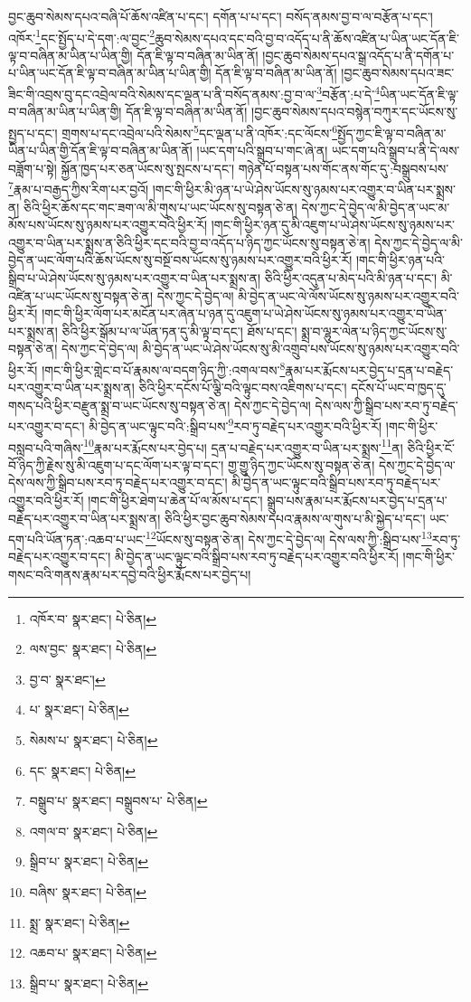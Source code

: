 བྱང་ཆུབ་སེམས་དཔའ་བཞི་པོ་ཆོས་འཛིན་པ་དང་། དགོན་པ་པ་དང་། བསོད་ནམས་བྱ་བ་ལ་བརྩོན་པ་དང་། འཁོར་\footnote{འཁོར་བ་  སྣར་ཐང་།  པེ་ཅིན། }དང་སྤྱོད་པ་དེ་དག་:ལ་བྱང་\footnote{ལས་བྱང་  སྣར་ཐང་།  པེ་ཅིན། }ཆུབ་སེམས་དཔའ་དང་བའི་བྱ་བ་འདོད་པ་ནི་ཆོས་འཛིན་པ་ཡིན་ཡང་དོན་ཇི་ལྟ་བ་བཞིན་མ་ཡིན་པ་ཡིན་གྱི། དོན་ཇི་ལྟ་བ་བཞིན་མ་ཡིན་ནོ། །བྱང་ཆུབ་སེམས་དཔའ་སྒྲ་འདོད་པ་ནི་དགོན་པ་པ་ཡིན་ཡང་དོན་ཇི་ལྟ་བ་བཞིན་མ་ཡིན་པ་ཡིན་གྱི། དོན་ཇི་ལྟ་བ་བཞིན་མ་ཡིན་ནོ། །བྱང་ཆུབ་སེམས་དཔའ་ཟང་ཟིང་གི་འབྲས་བུ་དང་འབྲེལ་བའི་སེམས་དང་ལྡན་པ་ནི་བསོད་ནམས་:བྱ་བ་ལ་\footnote{བྱ་བ་  སྣར་ཐང་། }བརྩོན་:པ་དེ་\footnote{པ་  སྣར་ཐང་།  པེ་ཅིན། }ཡིན་ཡང་དོན་ཇི་ལྟ་བ་བཞིན་མ་ཡིན་པ་ཡིན་གྱི། དོན་ཇི་ལྟ་བ་བཞིན་མ་ཡིན་ནོ། །བྱང་ཆུབ་སེམས་དཔའ་བསྙེན་བཀུར་དང་ཡོངས་སུ་སྤྱད་པ་དང་། གྲགས་པ་དང་འབྲེལ་པའི་སེམས་\footnote{སེམས་པ་  སྣར་ཐང་།  པེ་ཅིན། }དང་ལྡན་པ་ནི་འཁོར་:དང་ལོངས་\footnote{དང་  སྣར་ཐང་།  པེ་ཅིན། }སྤྱོད་ཀྱང་ཇི་ལྟ་བ་བཞིན་མ་ཡིན་པ་ཡིན་གྱི་དོན་ཇི་ལྟ་བ་བཞིན་མ་ཡིན་ནོ། །ཡང་དག་པའི་སྒྲུབ་པ་གང་ཞེ་ན། ཡང་དག་པའི་སྒྲུབ་པ་ནི་དེ་ལས་བཟློག་པ་སྟེ། སྐྱོན་ཁྱད་པར་ཅན་ཡོངས་སུ་སྤངས་པ་དང་། གཉེན་པོ་བསྟན་པས་གོང་ནས་གོང་དུ་:བསྒྲུབས་པས་\footnote{བསྒྲུབ་པ་  སྣར་ཐང་། བསྒྲུབས་པ་  པེ་ཅིན། }རྣམ་པ་བརྒྱད་ཀྱིས་རིག་པར་བྱའོ། །གང་གི་ཕྱིར་མི་ཉན་པ་ཡེ་ཤེས་ཡོངས་སུ་ཉམས་པར་འགྱུར་བ་ཡིན་པར་སྨྲས་ན། ཅིའི་ཕྱིར་ཆོས་དང་གང་ཟག་ལ་མི་གུས་པ་ཡང་ཡོངས་སུ་བསྟན་ཅེ་ན། དེས་ཀྱང་དེ་བྱེད་ལ་མི་བྱེད་ན་ཡང་མ་མོས་པས་ཡོངས་སུ་ཉམས་པར་འགྱུར་བའི་ཕྱིར་རོ། །གང་གི་ཕྱིར་ཉན་དུ་མི་འཇུག་པ་ཡེ་ཤེས་ཡོངས་སུ་ཉམས་པར་འགྱུར་བ་ཡིན་པར་སྨྲས་ན་ཅིའི་ཕྱིར་དང་བའི་བྱ་བ་འདོད་པ་ཉིད་ཀྱང་ཡོངས་སུ་བསྟན་ཅེ་ན། དེས་ཀྱང་དེ་བྱེད་ལ་མི་བྱེད་ན་ཡང་ལོག་པའི་ཆོས་ཡོངས་སུ་བསྔོ་བས་ཡོངས་སུ་ཉམས་པར་འགྱུར་བའི་ཕྱིར་རོ། །གང་གི་ཕྱིར་ཉན་པའི་སྒྲིབ་པ་ཡེ་ཤེས་ཡོངས་སུ་ཉམས་པར་འགྱུར་བ་ཡིན་པར་སྨྲས་ན། ཅིའི་ཕྱིར་འདུན་པ་མེད་པའི་མི་ཉན་པ་དང་། མི་འཛིན་པ་ཡང་ཡོངས་སུ་བསྟན་ཅེ་ན། དེས་ཀྱང་དེ་བྱེད་ལ། མི་བྱེད་ན་ཡང་ལེ་ལོས་ཡོངས་སུ་ཉམས་པར་འགྱུར་བའི་ཕྱིར་རོ། །གང་གི་ཕྱིར་ལོག་པར་མངོན་པར་ཞེན་པ་ཉན་དུ་འཇུག་པ་ཡེ་ཤེས་ཡོངས་སུ་ཉམས་པར་འགྱུར་བ་ཡིན་པར་སྨྲས་ན། ཅིའི་ཕྱིར་སྒོམ་པ་ལ་ཡོན་ཏན་དུ་མི་ལྟ་བ་དང་། ཐོས་པ་དང་། སྨྲ་བ་ལྷུར་ལེན་པ་ཉིད་ཀྱང་ཡོངས་སུ་བསྟན་ཅེ་ན། དེས་ཀྱང་དེ་བྱེད་ལ། མི་བྱེད་ན་ཡང་ཡེ་ཤེས་ཡོངས་སུ་མི་འགྲུབ་པས་ཡོངས་སུ་ཉམས་པར་འགྱུར་བའི་ཕྱིར་རོ། །གང་གི་ཕྱིར་གླེང་བ་པོ་རྣམས་ལ་བདག་ཉིད་ཀྱི་:འགལ་བས་\footnote{འགལ་བ་  སྣར་ཐང་།  པེ་ཅིན། }རྣམ་པར་རྨོངས་པར་བྱེད་པ་དྲན་པ་བརྗེད་པར་འགྱུར་བ་ཡིན་པར་སྨྲས་ན། ཅིའི་ཕྱིར་དངོས་པོ་ལྕི་བའི་ལྟུང་བས་འཇིགས་པ་དང་། དངོས་པོ་ཡང་བ་ཁྱད་དུ་གསད་པའི་ཕྱིར་བརྫུན་སྨྲ་བ་ཡང་ཡོངས་སུ་བསྟན་ཅེ་ན། དེས་ཀྱང་དེ་བྱེད་ལ། དེས་ལས་ཀྱི་སྒྲིབ་པས་རབ་ཏུ་བརྗེད་པར་འགྱུར་བ་དང་། མི་བྱེད་ན་ཡང་ལྟུང་བའི་:སྒྲིབ་པས་\footnote{སྒྲིབ་པ་  སྣར་ཐང་།  པེ་ཅིན། }རབ་ཏུ་བརྗེད་པར་འགྱུར་བའི་ཕྱིར་རོ། །གང་གི་ཕྱིར་བསླབ་པའི་གཞིས་\footnote{བཞིས་  སྣར་ཐང་།  པེ་ཅིན། }རྣམ་པར་རྨོངས་པར་བྱེད་པ། དྲན་པ་བརྗེད་པར་འགྱུར་བ་ཡིན་པར་སྨྲས་\footnote{སྨྲ་  སྣར་ཐང་།  པེ་ཅིན། }ན། ཅིའི་ཕྱིར་ངོ་བོ་ཉིད་ཀྱི་རྗེས་སུ་མི་འཇུག་པ་དང་ལོག་པར་ལྟ་བ་དང་། གྱ་གྱུ་ཉིད་ཀྱང་ཡོངས་སུ་བསྟན་ཅེ་ན། དེས་ཀྱང་དེ་བྱེད་ལ་དེས་ལས་ཀྱི་སྒྲིབ་པས་རབ་ཏུ་བརྗེད་པར་འགྱུར་བ་དང་། མི་བྱེད་ན་ཡང་ལྟུང་བའི་སྒྲིབ་པས་རབ་ཏུ་བརྗེད་པར་འགྱུར་བའི་ཕྱིར་རོ། །གང་གི་ཕྱིར་ཐེག་པ་ཆེན་པོ་ལ་མོས་པ་དང་། སྒྲུབ་པས་རྣམ་པར་རྨོངས་པར་བྱེད་པ་དྲན་པ་བརྗེད་པར་འགྱུར་བ་ཡིན་པར་སྨྲས་ན། ཅིའི་ཕྱིར་བྱང་ཆུབ་སེམས་དཔའ་རྣམས་ལ་གུས་པ་མི་སྐྱེད་པ་དང་། ཡང་དག་པའི་ཡོན་ཏན་:འཆབ་པ་ཡང་\footnote{འཆབ་པ་  སྣར་ཐང་།  པེ་ཅིན། }ཡོངས་སུ་བསྟན་ཅེ་ན། དེས་ཀྱང་དེ་བྱེད་ལ། དེས་ལས་ཀྱི་:སྒྲིབ་པས་\footnote{སྒྲིབ་པ་  སྣར་ཐང་།  པེ་ཅིན། }རབ་ཏུ་བརྗེད་པར་འགྱུར་བ་དང་། མི་བྱེད་ན་ཡང་ལྟུང་བའི་སྒྲིབ་པས་རབ་ཏུ་བརྗེད་པར་འགྱུར་བའི་ཕྱིར་རོ། །གང་གི་ཕྱིར་གསང་བའི་གནས་རྣམ་པར་དབྱེ་བའི་ཕྱིར་རྨོངས་པར་བྱེད་པ། 
